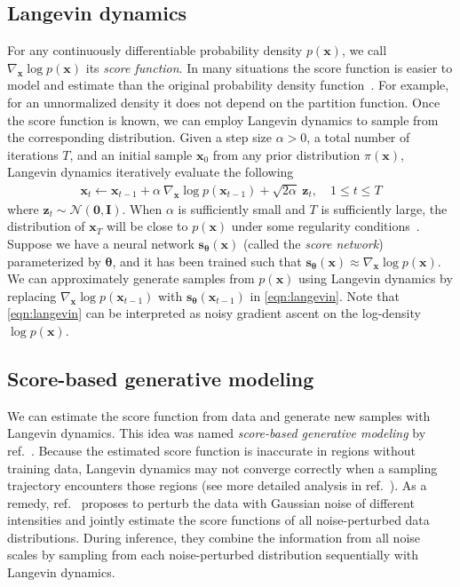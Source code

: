 \documentclass{article}
\newcommand{\mcal}{\mathcal}
\newcommand{\bfx}{\mathbf{x}}
\newcommand{\bfz}{\mathbf{z}}
\newcommand{\bfI}{\mathbf{I}}
\newcommand{\bfzero}{\mathbf{0}}
\newcommand{\bftheta}{{\boldsymbol{\theta}}}
\newcommand{\bfs}{\mathbf{s}}
\begin{document}
\subsection{Langevin dynamics}
For any continuously differentiable probability density $p(\bfx)$, we call $\nabla_\bfx \log p(\bfx)$ its \emph{score function}. In many situations the score function is easier to model and estimate than the original probability density function~\cite{hyvarinen2005estimation, song2019sliced}. For example, for an unnormalized density it does not depend on the partition function. Once the score function is known, we can employ Langevin dynamics to sample from the corresponding distribution. Given a step size $\alpha > 0$, a total number of iterations $T$, and an initial sample $\bfx_0$ from any prior distribution $\pi(\bfx)$, Langevin dynamics iteratively evaluate the following
\begin{align}
    \bfx_{t} \gets \bfx_{t-1} + \alpha ~\nabla_\bfx \log p(\bfx_{t-1}) + \sqrt{2\alpha} ~\bfz_{t}, \quad 1 \le t \le T \label{eqn:langevin}
\end{align}
where $\bfz_{t} \sim \mcal{N}(\bfzero, \bfI)$. When $\alpha$ is sufficiently small and $T$ is sufficiently large, the distribution of $\bfx_T$ will be close to $p(\bfx)$ under some regularity conditions~\cite{roberts1996exponential,welling2011bayesian}. Suppose we have a neural network $\bfs_\bftheta(\bfx)$ (called the \emph{score network}) parameterized by $\bftheta$, and it has been trained such that $\bfs_\bftheta(\bfx) \approx \nabla_\bfx \log p(\bfx)$. We can approximately generate samples from $p(\bfx)$ using Langevin dynamics by replacing $\nabla_\bfx \log p(\bfx_{t-1})$ with $\bfs_{\bftheta}(\bfx_{t-1})$ in \cref{eqn:langevin}.
Note that \cref{eqn:langevin} can be interpreted as noisy gradient ascent on the log-density $\log p(\bfx)$.

\subsection{Score-based generative modeling}\label{sec:ald}
We can estimate the score function from data and generate new samples with Langevin dynamics. This idea was named \emph{score-based generative modeling} by ref.~\cite{song2019generative}. Because the estimated score function is inaccurate in regions without training data, Langevin dynamics may not converge correctly when a sampling trajectory encounters those regions (see more detailed analysis in ref.~\cite{song2019generative}). As a remedy, ref.~\cite{song2019generative} proposes to perturb the data with Gaussian noise of different intensities and jointly estimate the score functions of all noise-perturbed data distributions. During inference, they combine the information from all noise scales by sampling from each noise-perturbed distribution sequentially with Langevin dynamics.
\end{document}
